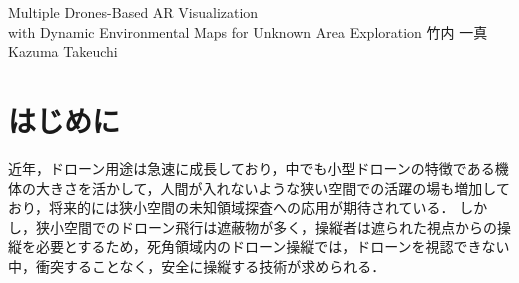 \documentclass[a4paper,10pt,twocolumn,uplatex]{jsarticle}
\date{14}
\begin{document}
{Multiple Drones-Based AR Visualization \\with Dynamic Environmental Maps for Unknown Area Exploration}
{竹内 一真}
{Kazuma Takeuchi}


\section{はじめに}
近年，ドローン用途は急速に成長しており，中でも小型ドローンの特徴である機体の大きさを活かして，人間が入れないような狭い空間での活躍の場も増加しており，将来的には狭小空間の未知領域探査への応用が期待されている\cite{Nonami}．
しかし，狭小空間でのドローン飛行は遮蔽物が多く，操縦者は遮られた視点からの操縦を必要とするため，死角領域内のドローン操縦では，ドローンを視認できない中，衝突することなく，安全に操縦する技術が求められる．
\end{document}

